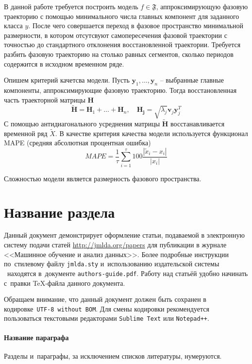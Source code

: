 \documentclass[12pt, twoside]{article}
\begin{document}
В данной работе требуется построить модель $f\in\mathfrak{F}$, аппроксимирующую фазовую траекторию с помощью минимального числа главных компонент для заданного класса $y$. После чего совершается переход в фазовое пространство минимальной размерности, в котором отсутсвуют самопересечения фазовой траектории с точностью до стандартного отклонения восстановленной траектории. Требуется разбить фазовую траекторию на столько равных сегментов, сколько периодов содержится в исходном временном ряде.
    \begin{figure}[ht]
    \end{figure}

Опишем критерий качетсва модели. Пусть $\mathbf{y}_1,\dots,\mathbf{y}_n$ -- выбранные главные компоненты, аппроксимирующие фазовую траекторию. Тогда восстановленная часть траекторной матрицы $\mathbf{H}$
    \[ \mathbf{\tilde{H}} = \mathbf{H}_1  + \dots + \mathbf{H}_n, \quad \mathbf{H_j} = \sqrt{\lambda_j}\mathbf{v}_j\mathbf{y}_j^T\]
С помощью антидиагонального усреднения матрицы $\mathbf{\tilde{H}}$ восстанавливается временной ряд $\tilde{X}$. В качестве критерия качества модели используется функционал MAPE (средняя абсолютная процентная ошибка)
    \[ MAPE = \frac{1}{\tau}\sum_{i = 1}^{\tau}100\frac{|\tilde{x}_i - x_i|}{|x_i|} \]
    
Сложностью модели является размерность фазового пространства.
    \begin{figure}[ht]
    \end{figure}
 
\section{Название раздела}
Данный документ демонстрирует оформление статьи,
подаваемой в электронную систему подачи статей \url{http://jmlda.org/papers} для публикации в журнале <<Машинное обучение и анализ данных>>.
Более подробные инструкции по~стилевому файлу \texttt{jmlda.sty} и~использованию издательской системы \LaTeXe\
находятся в~документе \texttt{authors-guide.pdf}.
Работу над статьёй удобно начинать с~правки \TeX-файла данного документа.

Обращаем внимание, что данный документ должен быть сохранен в кодировке~\verb'UTF-8 without BOM'.
Для смены кодировки рекомендуется пользоваться текстовыми редакторами \verb'Sublime Text' или \verb'Notepad++'.

\paragraph{Название параграфа}
Разделы и~параграфы, за исключением списков литературы, нумеруются.
\end{document}
